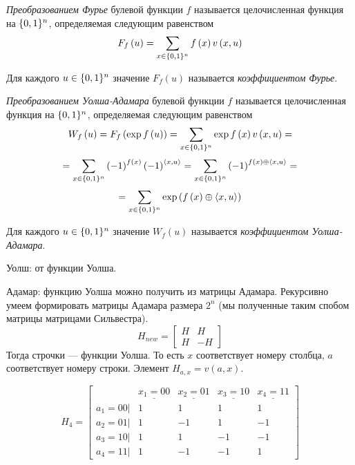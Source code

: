 \begin{definition}
\emph{Преобразованием Фурье} булевой функции $f$ называется целочисленная
функция на $\{0,1\}^n$, определяемая следующим равенством
\[
F_{f}\left(u\right)=\sum_{x\in \{0,1\}^n}f\left(x\right)v\left(x,u\right)
\]


Для каждого $u\in \{0,1\}^n$ значение $F_{f}\left(u\right)$ называется
\emph{коэффициентом Фурье}.
\end{definition}

\begin{definition}
\emph{Преобразованием Уолша-Адамара} булевой функции $f$ называется
целочисленная функция на $\{0,1\}^n$, определяемая следующим равенством
\[
W_{f}\left(u\right)=F_{f}\left(\exp f\left(u\right)\right)=\sum_{x\in \{0,1\}^n}\exp f\left(x\right)v\left(x,u\right)=
\]
\[
=\sum_{x\in \{0,1\}^n}\left(-1\right)^{f\left(x\right)}\left(-1\right)^{\left\langle x,u\right\rangle }=\sum_{x\in \{0,1\}^n}\left(-1\right)^{f\left(x\right)\oplus\left\langle x,u\right\rangle }=
\]
\[
=\sum_{x\in \{0,1\}^n}\exp\left(f\left(x\right)\oplus\left\langle x,u\right\rangle \right)
\]


Для каждого $u\in \{0,1\}^n$ значение $W_{f}\left(u\right)$ называется
\emph{коэффициентом Уолша-Адамара}.\end{definition}

Уолш: от функции Уолша.

Адамар: функцию Уолша можно получить из матрицы Адамара. Рекурсивно
умеем формировать матрицы Адамара размера $2^{n}$ (мы полученные
таким спобом матрицы матрицами Сильвестра). 
\[
H_{new}=\left[\begin{array}{cc}
H & H\\
H & -H
\end{array}\right]
\]
Тогда строчки --- функции Уолша. То есть $x$ соответствует номеру
столбца, $a$ соответствует номеру строки. Элемент $H_{a,x}=v\left(a,x\right)$.
\begin{example}
\[
H_{4}=\left[\begin{array}{ccccc}
 & \underline{x_{1}=00} & \underline{x_{2}=01} & \underline{x_{3}=10} & \underline{x_{4}=11}\\
a_{1}=00| & 1 & 1 & 1 & 1\\
a_{2}=01| & 1 & -1 & 1 & -1\\
a_{3}=10| & 1 & 1 & -1 & -1\\
a_{4}=11| & 1 & -1 & -1 & 1
\end{array}\right]
\]


\end{example}


